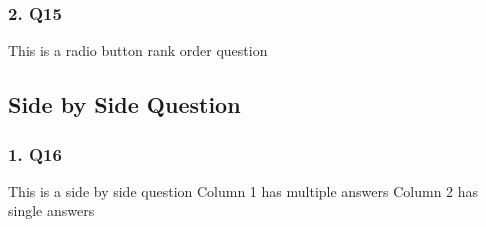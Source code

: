 \documentclass{article}\usepackage[]{graphicx}\usepackage[]{color}
\begin{document}
\hfill \break \hfill \break
\subsubsection*{2. Q15}
This is a radio button rank order question

\hfill \break \hfill \break
\subsection*{Side by Side Question}
\subsubsection*{1. Q16}
This is a side by side question Column 1 has multiple answers Column 2 has single answers

\hfill \break \hfill \break
\end{document}

